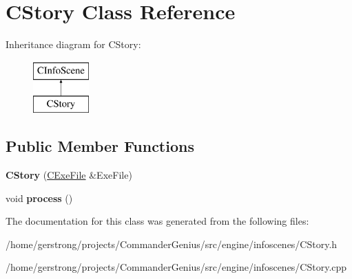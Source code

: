 \hypertarget{class_c_story}{
\section{CStory Class Reference}
\label{class_c_story}
}
Inheritance diagram for CStory:\begin{figure}[H]
\begin{center}
\leavevmode
\includegraphics[height=2cm]{class_c_story}
\end{center}
\end{figure}
\subsection*{Public Member Functions}
\begin{DoxyCompactItemize}
\item 
\hypertarget{class_c_story_a0432fbccd577da0fb5cf44402c4929f5}{
{\bfseries CStory} (\hyperlink{class_c_exe_file}{CExeFile} \&ExeFile)}
\label{class_c_story_a0432fbccd577da0fb5cf44402c4929f5}

\item 
\hypertarget{class_c_story_ac8ef549dedc7ee8ff1bc9d09e112a3a7}{
void {\bfseries process} ()}
\label{class_c_story_ac8ef549dedc7ee8ff1bc9d09e112a3a7}

\end{DoxyCompactItemize}


The documentation for this class was generated from the following files:\begin{DoxyCompactItemize}
\item 
/home/gerstrong/projects/CommanderGenius/src/engine/infoscenes/CStory.h\item 
/home/gerstrong/projects/CommanderGenius/src/engine/infoscenes/CStory.cpp\end{DoxyCompactItemize}
